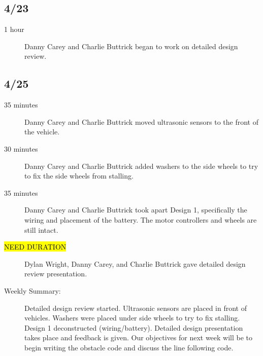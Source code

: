 \documentclass[11pt]{report}
\begin{document}
\begin{adjustwidth}{0.5cm}{0cm}
\subsection*{4/23}
\begin{greylineformat}
\begin{description}
    \item [1 hour] Danny Carey and Charlie Buttrick began to work on detailed design review. 
\end{description}\end{greylineformat}

\vspace{-2.1em}\subsection*{4/25}
\begin{greylineformat}
\begin{description}
    \item [35 minutes] Danny Carey and Charlie Buttrick moved ultrasonic sensors to the front of the vehicle. 
    \item [30 minutes] Danny Carey and Charlie Buttrick added washers to the side wheels to try to fix the side wheels from stalling. 
    \item [35 minutes] Danny Carey and Charlie Buttrick took apart Design 1, specifically the wiring and placement of the battery. The motor controllers and wheels are still intact. 
    \item [\hl{NEED DURATION}] Dylan Wright, Danny Carey, and Charlie Buttrick gave detailed design review presentation.
\end{description}\end{greylineformat}

\begin{description}
    \item [Weekly Summary:] Detailed design review started. Ultrasonic sensors are placed in front of vehicles. Washers were placed under side wheels to try to fix stalling. Design 1 deconstructed (wiring/battery). Detailed design presentation takes place and feedback is given. Our objectives for next week will be to begin writing the obstacle code and discuss the line following code.
\end{description}\vspace{0.5em}
\end{adjustwidth}
\end{document}
